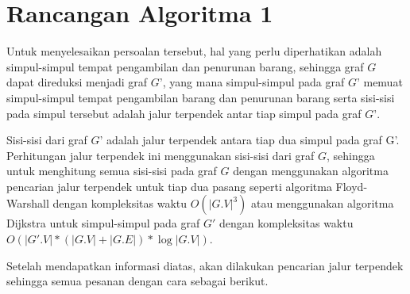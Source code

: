\section{Rancangan Algoritma 1}


Untuk menyelesaikan persoalan tersebut, hal yang perlu diperhatikan adalah simpul-simpul tempat pengambilan dan penurunan barang, sehingga graf $G$ 
dapat direduksi menjadi graf $G’$, yang mana simpul-simpul pada graf $G’$ memuat simpul-simpul tempat pengambilan barang dan penurunan barang serta 
sisi-sisi pada simpul tersebut adalah jalur terpendek antar tiap simpul pada graf $G’$.

Sisi-sisi dari graf $G’$ adalah jalur terpendek antara tiap dua simpul pada graf G'. 
Perhitungan jalur terpendek ini menggunakan sisi-sisi dari graf $G$, sehingga untuk menghitung semua sisi-sisi pada 
graf $G$ dengan menggunakan algoritma pencarian jalur terpendek untuk tiap dua pasang seperti algoritma Floyd-Warshall 
dengan kompleksitas waktu $O(|G.V|^{3})$ atau 
menggunakan algoritma Dijkstra untuk simpul-simpul pada graf $G'$ dengan kompleksitas waktu $O(|G'.V| * (|G.V| + |G.E|) * \log |G.V|)$.

Setelah mendapatkan informasi diatas, akan dilakukan pencarian jalur terpendek sehingga semua pesanan dengan cara sebagai berikut.
